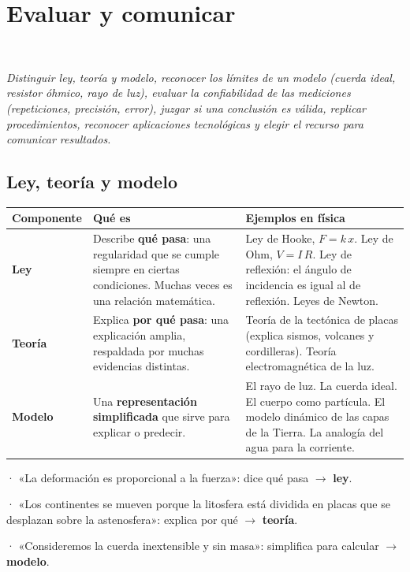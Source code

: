 \section[Evaluar y comunicar]{Evaluar y comunicar}
\modcomun\ \ {\color{gris}\itshape Distinguir ley, teoría y modelo, reconocer los límites de un modelo (cuerda ideal, resistor óhmico, rayo de luz), evaluar la confiabilidad de las mediciones (repeticiones, precisión, error), juzgar si una conclusión es válida, replicar procedimientos, reconocer aplicaciones tecnológicas y elegir el recurso para comunicar resultados.\par}
\subsection{Ley, teoría y modelo}
\begin{center}\small
\begin{tabularx}{\linewidth}{@{}>{\raggedright\arraybackslash\hsize=0.42\hsize}X>{\raggedright\arraybackslash\hsize=1.29\hsize}X>{\raggedright\arraybackslash\hsize=1.29\hsize}X@{}}
\toprule
\textbf{Componente} & \textbf{Qué es} & \textbf{Ejemplos en física} \\
\midrule
\textbf{Ley} & Describe \textbf{qué pasa}: una regularidad que se cumple siempre en ciertas condiciones. Muchas veces es una relación matemática. & Ley de Hooke, $F = k\,x$. Ley de Ohm, $V = I\,R$. Ley de reflexión: el ángulo de incidencia es igual al de reflexión. Leyes de Newton. \\
\textbf{Teoría} & Explica \textbf{por qué pasa}: una explicación amplia, respaldada por muchas evidencias distintas. & Teoría de la tectónica de placas (explica sismos, volcanes y cordilleras). Teoría electromagnética de la luz. \\
\textbf{Modelo} & Una \textbf{representación simplificada} que sirve para explicar o predecir. & El rayo de luz. La cuerda ideal. El cuerpo como partícula. El modelo dinámico de las capas de la Tierra. La analogía del agua para la corriente. \\
\bottomrule
\end{tabularx}
\end{center}
  
\begin{clave} · «La deformación es proporcional a la fuerza»: dice qué pasa \ensuremath{\rightarrow} \textbf{ley}.\par · «Los continentes se mueven porque la litosfera está dividida en placas que se desplazan sobre la astenosfera»: explica por qué \ensuremath{\rightarrow} \textbf{teoría}.\par · «Consideremos la cuerda inextensible y sin masa»: simplifica para calcular \ensuremath{\rightarrow} \textbf{modelo}.\end{clave}
  
